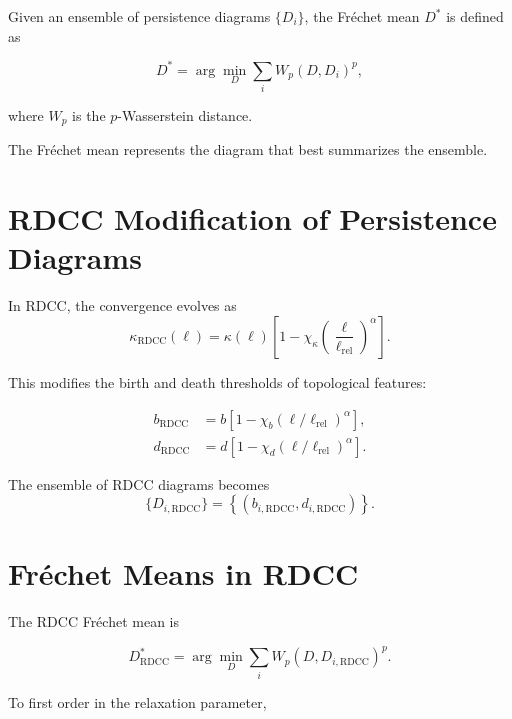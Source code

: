 \documentclass[11pt,a4paper]{article}
\begin{document}
Given an ensemble of persistence diagrams $\{D_{i}\}$, the Fréchet mean $D^{*}$ is 
defined as

\begin{equation}
    D^{*}
    = \arg\min_{D}
      \sum_{i}
      W_{p}(D, D_{i})^{p},
\end{equation}

where $W_{p}$ is the $p$-Wasserstein distance.

The Fréchet mean represents the diagram that best summarizes the ensemble.
\section{RDCC Modification of Persistence Diagrams}

In RDCC, the convergence evolves as
\begin{equation}
    \kappa_{\mathrm{RDCC}}(\ell)
    = \kappa(\ell)
      \left[
        1 - \chi_{\kappa}
        \left(\frac{\ell}{\ell_{\mathrm{rel}}}\right)^{\alpha}
      \right].
\end{equation}

This modifies the birth and death thresholds of topological features:

\begin{align}
    b_{\mathrm{RDCC}} &= b \left[ 1 - \chi_{b} (\ell/\ell_{\mathrm{rel}})^{\alpha} \right], \\
    d_{\mathrm{RDCC}} &= d \left[ 1 - \chi_{d} (\ell/\ell_{\mathrm{rel}})^{\alpha} \right].
\end{align}

The ensemble of RDCC diagrams becomes
\begin{equation}
    \{ D_{i,\mathrm{RDCC}} \}
    = \left\{
        (b_{i,\mathrm{RDCC}}, d_{i,\mathrm{RDCC}})
      \right\}.
\end{equation}
\section{Fréchet Means in RDCC}

The RDCC Fréchet mean is

\begin{equation}
    D^{*}_{\mathrm{RDCC}}
    = \arg\min_{D}
      \sum_{i}
      W_{p}(D, D_{i,\mathrm{RDCC}})^{p}.
\end{equation}

To first order in the relaxation parameter,
\end{document}
